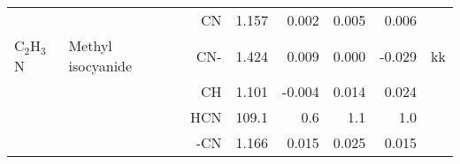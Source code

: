 \begin{table}
\begin{center}
\begin{tabular}{llrrrrrr}
        &                                    &CN            &     1.157   &     0.002 &     0.005 &     0.006 &       \\
 C$_2$H$_3$N       & Methyl isocyanide                  &CN-           &     1.424   &     0.009 &     0.000 &    -0.029 &    kk \\
        &                                    &CH            &     1.101   &    -0.004 &     0.014 &     0.024 &       \\
        &                                    &HCN         &     109.1   &       0.6 &       1.1 &       1.0   &       \\
        &                                    &-CN           &     1.166   &     0.015 &     0.025 &     0.015 &       \\
\hline
\end{tabular}
\end{center}
\end{table}
\clearpage

